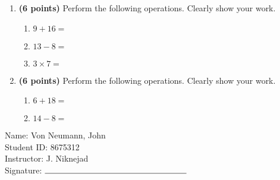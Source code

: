 \documentclass[12pt]{amsart}
\begin{document}
\newpage
\begin{enumerate}
\item {\bf (6 points)} 
 Perform the following operations. Clearly show your work. \begin{enumerate}


\def \a{9}\def \b{16}\def \apb{25}

 
\item $\a + \b = $

\vspace{2cm}
\def \a{13}\def \dif{5}\def \b{8}

 
\item $\a - \b = $

\vspace{2cm}
\def \a{3}\def \b{7}\def \ab{10}

 
\item $\a \times \b = $ 

\vspace{2cm}
\def \vshift{-1}\def \hshift{4}\def \chang{0}\def \findval{4}\def \yval{-1}

 
\end{enumerate}


\newpage
\item {\bf (6 points)} 
 Perform the following operations. Clearly show your work. \begin{enumerate}


\def \a{6}\def \b{18}\def \apb{24}

 
\item $\a + \b = $

\vspace{2cm}
\def \a{14}\def \dif{6}\def \b{8}

 
\item $\a - \b = $

\vspace{2cm}
\def \vshift{3}\def \hshift{-4}\def \chang{-1}\def \findval{-5}\def \yval{5}

 
\end{enumerate}


\newpage\end{enumerate}\graphicspath{{C:/Users/iainc/anaconda3/Randomizer/Sample Course/Sample Assessment 2/}}\setcounter{page}{1}


\thispagestyle{fancy}

 \noindent Name: Von Neumann, John \vspace{.3cm} \\\noindent Student ID: 8675312 \vspace{.3cm} \\\noindent Instructor: J. Niknejad \vspace{.3cm} \\\noindent Signature: $\rule{6cm}{0.15mm}$ \vspace{.3cm} \\ 
\end{document}
